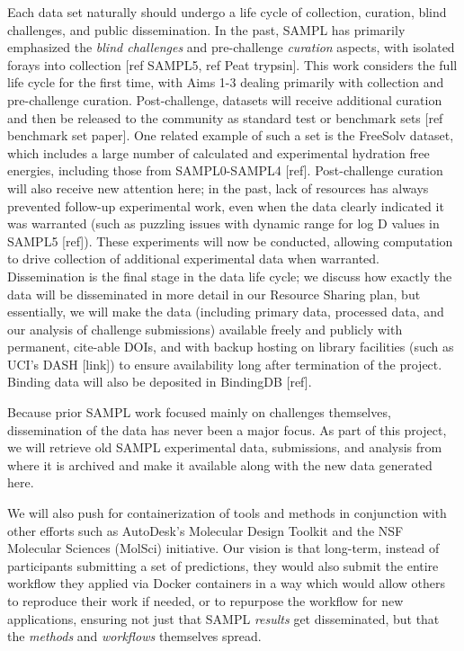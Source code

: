 \documentclass[11pt]{article}
\begin{document}
Each data set naturally should undergo a life cycle of collection, curation, blind challenges, and public dissemination.
In the past, SAMPL has primarily emphasized the \emph{blind challenges} and pre-challenge \emph{curation} aspects, with isolated forays into collection [ref SAMPL5, ref Peat trypsin]. 
This work considers the full life cycle for the first time, with Aims 1-3 dealing primarily with collection and pre-challenge curation.
Post-challenge, 
datasets will receive additional curation and then be released to the community as standard test or benchmark sets [ref benchmark set paper]. 
One related example of such a set is the FreeSolv dataset, which includes a large number of calculated and experimental hydration free energies, including those from SAMPL0-SAMPL4 [ref].
Post-challenge curation will also receive new attention here; in the past, lack of resources has always prevented follow-up experimental work, even when the data clearly indicated it was warranted (such as puzzling issues with dynamic range for log D values in SAMPL5 [ref]).
These experiments will now be conducted, allowing computation to drive collection of additional experimental data when warranted.
Dissemination is the final stage in the data life cycle; we discuss how exactly the data will be disseminated in more detail in our Resource Sharing plan, but essentially, we will make the data (including primary data, processed data, and our analysis of challenge submissions) available freely and publicly with permanent, cite-able DOIs, and with backup hosting on library facilities (such as UCI's DASH [link]) to ensure availability long after termination of the project.
Binding data will also be deposited in BindingDB [ref].

Because prior SAMPL work focused mainly on challenges themselves, dissemination of the data has never been a major focus.
As part of this project, we will retrieve old SAMPL experimental data, submissions, and analysis from where it is archived and make it available along with the new data generated here. 

We will also push for containerization of tools and methods in conjunction with other efforts such as AutoDesk's Molecular Design Toolkit and the NSF Molecular Sciences (MolSci) initiative.
Our vision is that long-term, instead of participants submitting a set of predictions, they would also submit the entire workflow they applied via Docker containers in a way which would allow others to reproduce their work if needed, or to repurpose the workflow for new applications, ensuring not just that SAMPL \emph{results} get disseminated, but that the \emph{methods} and \emph{workflows} themselves spread.
\end{document}

